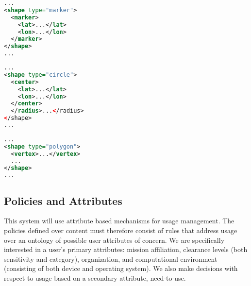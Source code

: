 \par\noindent
\begin{minipage}[t]{.30\textwidth}
\begin{lstlisting}[language=xml, label=lst:marker-shape, caption=Marker]
...
<shape type="marker">
  <marker>
    <lat>...</lat>
    <lon>...</lon>
  </marker>
</shape>
...
\end{lstlisting}
\end{minipage}
\hfill
\begin{minipage}[t]{.30\textwidth}
\begin{lstlisting}[language=xml, label=lst:circle-shape, caption=Circle]
...
<shape type="circle">
  <center>
    <lat>...</lat>
    <lon>...</lon>
  </center>
  </radius>...</radius>
</shape>
...
\end{lstlisting}
\end{minipage}
\hfill
\begin{minipage}[t]{.30\textwidth}
\begin{lstlisting}[language=xml, label=lst:polygon-shape, caption=Polygon]
...
<shape type="polygon">
  <vertex>...</vertex>
  ...
</shape>
...
\end{lstlisting}
\end{minipage}

\subsection{Policies and Attributes}
This system will use attribute based mechanisms for usage management.  The policies defined over content must therefore consist of rules that address usage over an ontology of possible user attributes of concern.  We are specifically interested in a user's primary attributes: mission affiliation, clearance levels (both sensitivity and category), organization, and computational environment (consisting of both device and operating system).  We also make decisions with respect to usage based on a secondary attribute, need-to-use.

